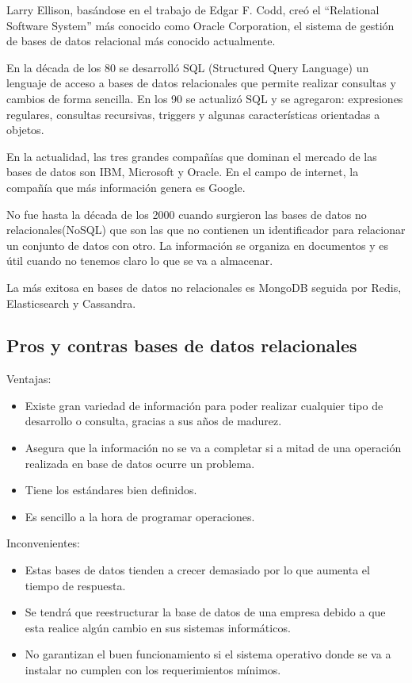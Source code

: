 \documentclass[12pt]{report} %
\begin{document}
	Larry Ellison, basándose en el trabajo de Edgar F. Codd, creó el “Relational Software System” más conocido como Oracle Corporation, el sistema de gestión de bases de datos relacional más conocido actualmente.
	
	En la década de los 80 se desarrolló SQL (Structured Query Language) un lenguaje de acceso a bases de datos relacionales que permite realizar consultas y cambios de forma sencilla. En los 90 se actualizó SQL y se agregaron: expresiones regulares, consultas recursivas, triggers y algunas características orientadas a objetos.
	
	En la actualidad, las tres grandes compañías que dominan el mercado de las bases de datos son IBM, Microsoft y Oracle. En el campo de internet, la compañía que más información genera es Google.
	
	No fue hasta la década de los 2000 cuando surgieron las bases de datos no relacionales(NoSQL) que son las que no contienen un identificador para relacionar un conjunto de datos con otro. La información se organiza en documentos y es útil cuando no tenemos claro lo que se va a almacenar.
	
	La más exitosa en bases de datos no relacionales es MongoDB seguida por Redis, Elasticsearch y Cassandra.
	
	\subsection{Pros y contras bases de datos relacionales}
	Ventajas:
	 \begin{itemize}
		\item Existe gran variedad de información para poder realizar cualquier tipo de desarrollo o consulta, gracias a sus años de madurez.
		\item Asegura que la información no se va a completar si a mitad de una operación realizada en base de datos ocurre un problema.
		\item Tiene los estándares bien definidos.
		\item Es sencillo a la hora de programar operaciones.
	\end{itemize}
	Inconvenientes:
		 \begin{itemize}
		\item Estas bases de datos tienden a crecer demasiado por lo que aumenta el tiempo de respuesta.
		\item	Se tendrá que reestructurar la base de datos de una empresa debido a que esta realice algún cambio en sus sistemas informáticos.
		\item 	No garantizan el buen funcionamiento si el sistema operativo donde se va a instalar no cumplen con los requerimientos mínimos.
	\end{itemize}
\end{document}
